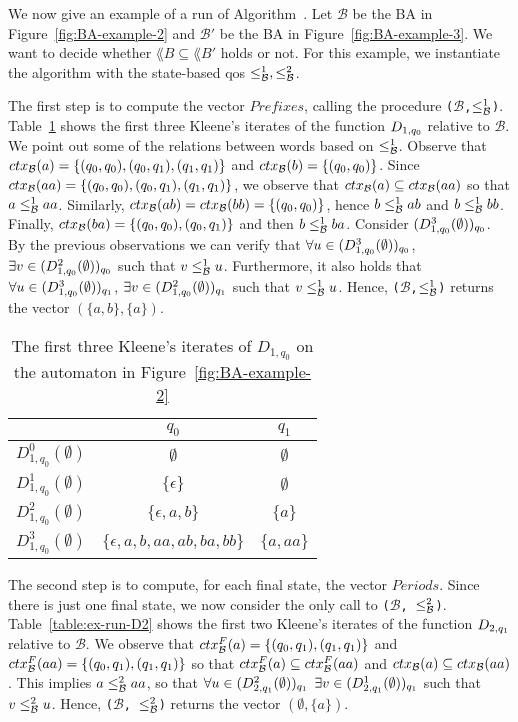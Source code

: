 \begin{example}
We now give an example of a run of Algorithm~.
Let $\mathcal{B}$ be the BA in Figure~\ref{fig:BA-example-2} and $\mathcal{B}'$
be the BA in Figure~\ref{fig:BA-example-3}.
We want to decide whether $\lang{B} \subseteq \lang{B'}$ holds or not.
For this example, we instantiate the algorithm with the state-based qos
$\leq^1_{\mathcal{B}}, \leq^2_{\mathcal{B}}$.

The first step is to compute the vector $Prefixes$, calling the
procedure \texttt{($\mathcal{B}$,$\leq^1_{\mathcal{B}}$)}.
Table~\ref{table:ex-run-D1} shows the first three Kleene's iterates of the function
$D_{1,q_0}$ relative to $\mathcal{B}$.
We point out some of the relations between words based on $\leq^1_{\mathcal{B}}$.
Observe that $ctx_{\mathcal{B}}(a) = \{(q_0,q_0),(q_0,q_1),(q_1,q_1)\}$ and
$ctx_{\mathcal{B}}(b) = \{(q_0,q_0)\}$.
Since $ctx_{\mathcal{B}}(aa) = \{(q_0,q_0),(q_0,q_1),(q_1,q_1)\}$, we observe that
$ctx_{\mathcal{B}}(a) \subseteq ctx_{\mathcal{B}}(aa)$ so that $a \leq^1_{\mathcal{B}} aa$.
Similarly, $ctx_{\mathcal{B}}(ab) = ctx_{\mathcal{B}}(bb) = \{(q_0,q_0)\}$, hence
$b \leq^1_{\mathcal{B}} ab$ and $b \leq^1_{\mathcal{B}} bb$.
Finally, $ctx_{\mathcal{B}}(ba) = \{(q_0,q_0),(q_0,q_1)\}$ and then $b \leq^1_{\mathcal{B}} ba$.
Consider $(D_{1,q_0}^{3}(\emptyset))_{q_0}$.
By the previous observations we can verify that $\forall u \in (D_{1,q_0}^{3}(\emptyset))_{q_0}$,
$\exists v \in (D_{1,q_0}^{2}(\emptyset))_{q_0}$ such that $v \leq^1_{\mathcal{B}} u$.
Furthermore, it also holds that $\forall u \in (D_{1,q_0}^{3}(\emptyset))_{q_1}$,
$\exists v \in (D_{1,q_0}^{2}(\emptyset))_{q_1}$ such that $v \leq^1_{\mathcal{B}} u$.
Hence, \texttt{($\mathcal{B}$,$\leq^1_{\mathcal{B}}$)} returns the vector
$(\{a,b\}, \{a\})$.

\begin{table}[h]
\centering
\begin{tabular}{ c | c | c }
 & $q_0$ & $q_1$ \\
\hline
$D_{1,q_0}^0(\emptyset)$ & $\emptyset$ & $\emptyset$ \\
$D_{1,q_0}^1(\emptyset)$ & $\{\epsilon\}$ & $\emptyset$ \\
$D_{1,q_0}^2(\emptyset)$ & $\{\epsilon, a, b\}$ & $\{a\}$ \\
$D_{1,q_0}^3(\emptyset)$ & $\{\epsilon, a, b, aa, ab, ba, bb\}$ & $\{a, aa\}$ \\
\end{tabular}
\caption{The first three Kleene's iterates of $D_{1,q_0}$ on the automaton in Figure~\ref{fig:BA-example-2}}
\label{table:ex-run-D1}
\end{table}

The second step is to compute, for each final state, the vector $Periods$.
Since there is just one final state, we now consider the only call to
\texttt{($\mathcal{B}$, $\leq^2_{\mathcal{B}}$)}.
Table~\ref{table:ex-run-D2} shows the first two Kleene's iterates of the function
$D_{2,q_1}$ relative to $\mathcal{B}$.
We observe that $ctx^F_{\mathcal{B}}(a) = \{(q_0,q_1), (q_1,q_1)\}$ and $ctx^F_{\mathcal{B}}(aa) = \{(q_0,q_1),(q_1,q_1)\}$
so that $ctx^F_{\mathcal{B}}(a) \subseteq ctx^F_{\mathcal{B}}(aa)$ and $ctx_{\mathcal{B}}(a) \subseteq ctx_{\mathcal{B}}(aa)$.
This implies $a \leq^2_{\mathcal{B}} aa$, so that $\forall u \in (D_{2,q_1}^{2}(\emptyset))_{q_1}$
$\exists v \in (D_{2,q_1}^{1}(\emptyset))_{q_1}$ such that $v \leq^2_{\mathcal{B}} u$.
Hence, \texttt{($\mathcal{B}$, $\leq^2_{\mathcal{B}}$)} returns the vector $(\emptyset, \{a\})$.


\end{example}
